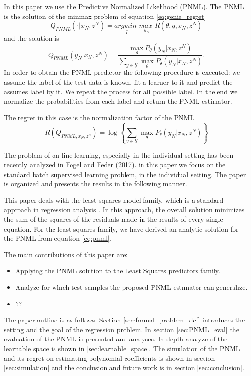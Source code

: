 \documentclass[letterpaper, 10 pt, conference]{ieeeconf}  %
\def\pnmlSingle{\max_{\theta} P_\theta (y_N|x_N, z^N)}
\begin{document}
In this paper we use the Predictive Normalized Likelihood (PNML). The PNML is the solution of the minmax problem of equation \ref{eq:genie_regret} \cite{shtar1987universal}
\begin{equation}
Q_{\textit{PNML}}(\cdot|x_N,z^N) = \underset{q}{\textit{argmin }}\underset{y_N}{\textit{max }} R(\theta, q, x_N, z^N)
\end{equation}
and the solution is 
\begin{equation} \label{eq:pnml}
Q_{PNML}(y_N|x_N,z^N)=\frac{\pnmlSingle}{\sum_{y\in \mathcal{Y}} \pnmlSingle}.
\end{equation}
In order to obtain the PNML predictor the following procedure is executed: we assume the label of the test data is known, fit a learner to it and predict the assumes label by it. We repeat the process for all possible label. In the end we normalize the probabilities from each label and return the PNML estimator.

The regret in this case is the normalization factor of the PNML
\begin{equation} \label{eq:pnml_regret}
R(Q_{\textit{PNML}, x_N, z^N}) = \log \left\{ \sum_{y\in \mathcal{Y}} \pnmlSingle \right\}
\end{equation}

The problem of on-line learning, especially in the individual setting has been recently analyzed in Fogel
and Feder (2017). in this paper we focus on the standard batch supervised learning problem, in the individual setting. The paper is organized and presents the results in
the following manner.

This paper deals with the least squares model family, which is a standard approach in regression analysis \cite{lawson1995solving}. In this approach, the overall solution minimizes the sum of the squares of the residuals made in the results of every single equation. For the least squares family, we have derived an analytic solution for the PNML from equation \ref{eq:pnml}.

The main contributions of this paper are:
\begin{itemize}
  \item Applying the PNML solution to the Least Squares predictors family.
  \item Analyze for which test samples the proposed PNML estimator can generalize. 
  \item ??
\end{itemize}

The paper outline is as follows.
Section \ref{sec:formal_problem_def} introduces the setting and the goal of the regression problem. In section \ref{sec:PNML_eval} the evaluation of the PNML is presented and analyses. In depth analyze of the learnable space is shown in \ref{sec:learnable_space}. The simulation of the PNML and its regret on estimating polynomial coefficients is shown in section \ref{sec:simulation} and the conclusion and future work is in section \ref{sec:conclusion}.
\end{document}
